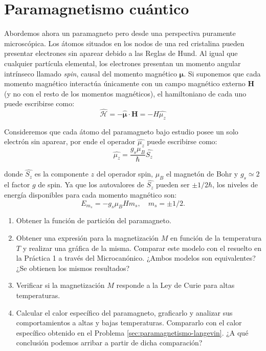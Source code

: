 \documentclass[a4paper,11pt]{article}
\begin{document}
\section{Paramagnetismo cuántico}
\label{sec:paramagnetismo-cuantico}

Abordemos ahora un paramagneto pero desde una perspectiva puramente
microscópica. Los átomos situados en los nodos de una red cristalina pueden
presentar electrones sin aparear debido a las Reglas de Hund. Al igual que
cualquier partícula elemental, los electrones presentan un momento angular
intrínseco llamado \emph{spin}, causal del momento magnético
$\boldsymbol{\mu}$.
Si suponemos que cada momento magnético interactúa únicamente con un
campo magnético externo $\textbf{H}$ (y no con el resto de los momentos
magnéticos), el hamiltoniano de cada uno puede escribirse como:
$$ \hat{\mathcal{H}} =
- \hat{\boldsymbol{\mu}} \cdot \textbf{H} = - H \hat{\mu_z} $$

Consideremos que cada átomo del paramagneto bajo estudio posee un solo
electrón sin aparear, por ende el operador $\hat{\mu_z}$ puede
escribirse como:
$$ \hat{\mu_z} = \frac{g_s \mu_B}{\hbar} \hat{S_z} $$

donde $\hat{S_z}$ es la componente $z$ del operador spin, $\mu_B$ el
magnetón de Bohr y $g_s \simeq 2$ el factor $g$ de spin. Ya que los
autovalores de $\hat{S_z}$ pueden ser $\pm 1/2 \hbar$, los niveles de
energía disponibles para cada momento magnético son: $$ E_{m_s} = - g_s
\mu_B H m_s, \quad  m_s = \pm 1/2 .$$

\begin{enumerate}[label=(\alph*),
                  leftmargin=2\parindent,
                  rightmargin=2\parindent]

    \item{Obtener la función de partición del paramagneto.}

    \item{Obtener una expresión para la magnetización $M$ en función
          de la temperatura $T$ y realizar una gráfica de la misma.
          Comparar este modelo con el resuelto en la Práctica 1 a
          través del Microcanónico.
          ¿Ambos modelos son equivalentes?
          ¿Se obtienen los mismos resultados?}

    \item{Verificar si la magnetización $M$ responde a la Ley de Curie
          para altas temperaturas.}

    \item{Calcular el calor específico del paramagneto, graficarlo y
          analizar sus comportamientos a altas y bajas temperaturas.
          Compararlo con el calor específico obtenido en el Problema
          \ref{sec:paramagnetismo-langevin}.
          ¿A qué conclusión podemos arribar a partir de dicha
          comparación?
          }

\end{enumerate}
\end{document}
